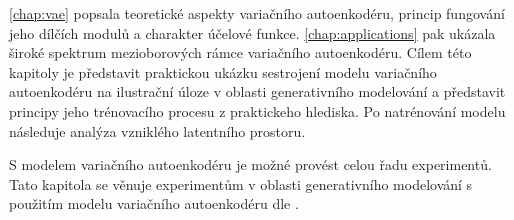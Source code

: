\autoref{chap:vae} popsala teoretické aspekty variačního autoenkodéru, princip fungování jeho dílčích modulů a charakter účelové funkce.
\autoref{chap:applications} pak ukázala široké spektrum mezioborových rámce variačního autoenkodéru.
Cílem této kapitoly je představit praktickou ukázku sestrojení modelu variačního autoenkodéru na ilustrační úloze v oblasti generativního modelování a představit principy jeho trénovacího procesu z praktickeho hlediska.
Po natrénování modelu následuje analýza vzniklého latentního prostoru.

S modelem variačního autoenkodéru je možné provést celou řadu experimentů.
Tato kapitola se věnuje experimentům v oblasti generativního modelování s použitím modelu variačního autoenkodéru dle \textcite{Kingma2014}.